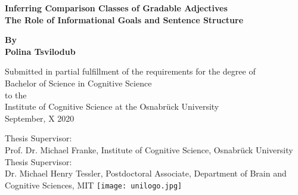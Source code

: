 \begin{titlepage}
	\begin{center}
		\vspace*{1cm}
		\Huge
		\textbf{Inferring Comparison Classes of Gradable Adjectives\\} 
		\vspace{0.5cm}
		\Large
		\textbf{The Role of Informational Goals and Sentence Structure}
		
		\vspace{1cm}
		
	
		\textbf{By \\ Polina Tsvilodub}
		
		\vspace{1cm}
		\small
		Submitted in partial fulfillment of the requirements for the degree of \\
		Bachelor of Science in Cognitive Science \\ to the \\
		Institute of Cognitive Science at the Osnabrück University\\
		September, X 2020
		
		\vspace{3cm}
		Thesis Supervisor:\\ Prof. Dr. Michael Franke, Institute of Cognitive Science, Osnabrück University \\
		\vspace{0.5cm}
		Thesis Supervisor:\\ Dr. Michael Henry Tessler, Postdoctoral Associate, Department of Brain and Cognitive Sciences, MIT  
		\vfill 
		\texttt{[image: unilogo.jpg]}
		
	\end{center}
\end{titlepage}